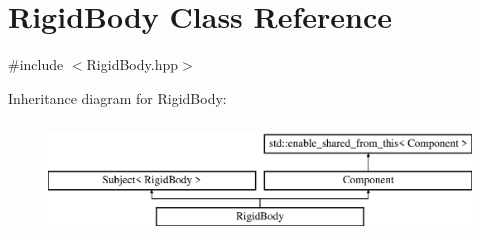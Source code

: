 \hypertarget{class_rigid_body}{}\section{Rigid\+Body Class Reference}
\label{class_rigid_body}


{\ttfamily \#include $<$Rigid\+Body.\+hpp$>$}

Inheritance diagram for Rigid\+Body\+:\begin{figure}[H]
\begin{center}
\leavevmode
\includegraphics[height=3.000000cm]{class_rigid_body}
\end{center}
\end{figure}
